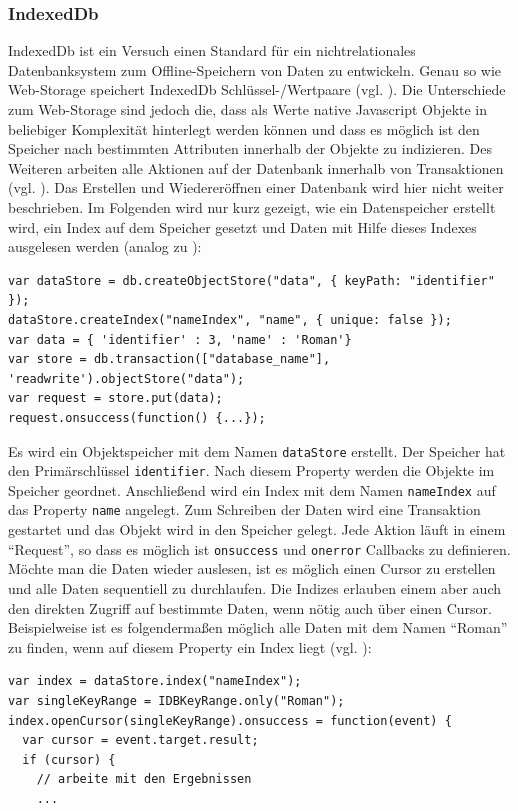 \subsubsection*{IndexedDb}
IndexedDb ist ein Versuch einen Standard für ein nichtrelationales Datenbanksystem zum Offline-Speichern von Daten zu entwickeln. Genau so wie Web-Storage speichert IndexedDb Schlüssel-/Wertpaare (vgl. \cite{Mehta2012}). Die Unterschiede zum Web-Storage sind jedoch die, dass als Werte native Javascript Objekte in beliebiger Komplexität hinterlegt werden können und dass es möglich ist den Speicher nach bestimmten Attributen innerhalb der Objekte zu indizieren. Des Weiteren arbeiten alle Aktionen auf der Datenbank innerhalb von Transaktionen (vgl. \cite{MDN2011}). Das Erstellen und Wiedereröffnen einer Datenbank wird hier nicht weiter beschrieben. Im Folgenden wird nur kurz gezeigt, wie ein Datenspeicher erstellt wird, ein Index auf dem Speicher gesetzt und Daten mit Hilfe dieses Indexes ausgelesen werden (analog zu \cite{Mahemoff2010}):
\begin{lstlisting}
var dataStore = db.createObjectStore("data", { keyPath: "identifier" });
dataStore.createIndex("nameIndex", "name", { unique: false });
var data = { 'identifier' : 3, 'name' : 'Roman'}
var store = db.transaction(["database_name"], 'readwrite').objectStore("data");
var request = store.put(data);
request.onsuccess(function() {...});
\end{lstlisting}  
Es wird ein Objektspeicher mit dem Namen \texttt{dataStore} erstellt. Der Speicher hat den Primärschlüssel \texttt{identifier}. Nach diesem Property werden die Objekte im Speicher geordnet. Anschließend wird ein Index mit dem Namen \texttt{nameIndex} auf das Property \texttt{name} angelegt. Zum Schreiben der Daten wird eine Transaktion gestartet und das Objekt wird in den Speicher gelegt. Jede Aktion läuft in einem "`Request"', so dass es möglich ist \texttt{onsuccess} und \texttt{onerror} Callbacks zu definieren. Möchte man die Daten wieder auslesen, ist es möglich einen Cursor zu erstellen und alle Daten sequentiell zu durchlaufen. Die Indizes erlauben einem aber auch den direkten Zugriff auf bestimmte Daten, wenn nötig auch über einen Cursor.  Beispielweise ist es folgendermaßen möglich alle Daten mit dem Namen "`Roman"' zu finden, wenn auf diesem Property ein Index liegt (vgl. \cite{MDN2011}):
\begin{lstlisting}
var index = dataStore.index("nameIndex");
var singleKeyRange = IDBKeyRange.only("Roman");
index.openCursor(singleKeyRange).onsuccess = function(event) {
  var cursor = event.target.result;
  if (cursor) {
    // arbeite mit den Ergebnissen
    ...
\end{lstlisting} 

